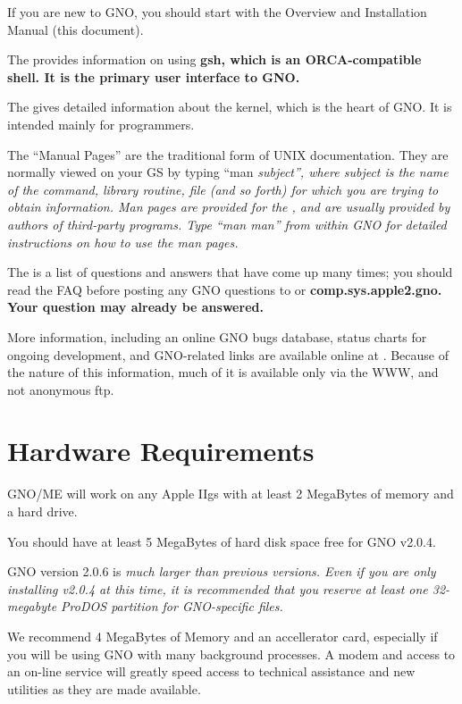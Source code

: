 \documentclass{report}
\begin{document}
If you are new to GNO, you should start with the Overview and Installation
Manual (this document).

The  provides information on using \bf gsh\rm, 
which is an ORCA-compatible shell.  It is the primary user interface
to GNO.

The  gives detailed information about
the kernel, which is the heart of GNO.  It is intended mainly for programmers.

The ``Manual Pages'' are the traditional form of UNIX documentation.
They are normally viewed on your GS by typing ``man \it subject\rm'',
where \it subject \rm  is the name of the command, library routine, file
(and so forth) for which you are trying to obtain information.
Man pages are provided for the , and are
usually provided by authors of third-party programs.  Type ``man man''
from within GNO for detailed instructions on how to use the man pages.

The  is a list of questions and answers that have come 
up many times; you should read the FAQ before posting any GNO questions
to  or \bf comp.sys.apple2.gno\rm.  Your question may
already be answered.

More information, including an online GNO bugs database, status charts
for ongoing development, and GNO-related links are available online
at .  Because of the nature of this
information, much of it is available only via the WWW, and not 
anonymous ftp.

\section{Hardware Requirements}

GNO/ME will work on any Apple IIgs with at least 2 MegaBytes of
memory and a hard drive.

You should have at least 5 MegaBytes of hard disk space free for GNO
v2.0.4.

GNO version 2.0.6 is \em much \rm  larger than previous versions.
Even if you are only installing v2.0.4 at this time, it is recommended
that you reserve at least one 32-megabyte ProDOS partition for
GNO-specific files.

We recommend 4 MegaBytes of Memory and an 
accellerator card, especially if you will be using GNO with many
background processes. A modem and access to an on-line service
will greatly speed access to technical assistance and new
utilities as they are made available.
\end{document}
